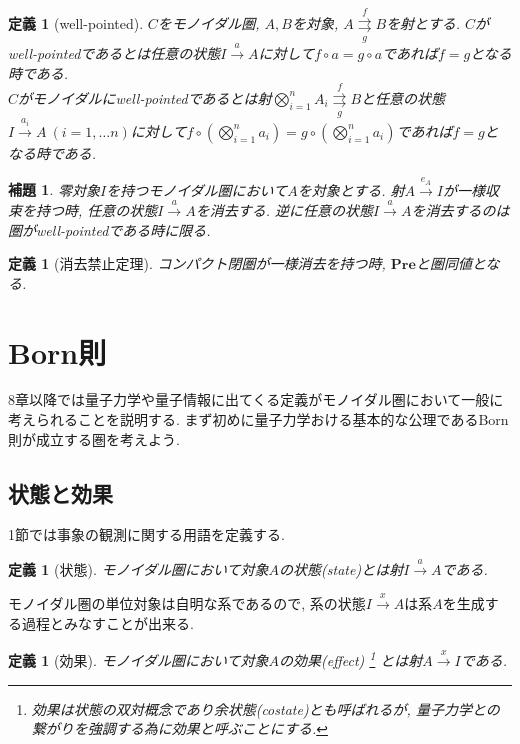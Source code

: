 \documentclass[a4paper,12pt]{ltjsarticle}
\theoremstyle{break}
\newtheorem{defn}[thm]{定義}
\newtheorem{lem}[thm]{補題}
\newcommand{\hilb}{\mathbf{Hilb}}
\newcommand{\pre}{\mathbf{Pre}}
\newcommand{\mbc}{\mathbb{C}}
\newcommand{\xr}[1]{\xrightarrow{#1}}
\newcommand{\ci}{\circ}
\newcommand{\bigot}{\bigotimes}
\numberwithin{equation}{section}
\begin{document}
\begin{defn}[well-pointed]
  $C$をモノイダル圏, $A,B$を対象, $A \overset{f}{\underset{g}{\rightrightarrows}} B$を射とする. 
  $C$がwell-pointedであるとは任意の状態$I \xr{a} A$に対して$f \ci a=g \ci a$であれば$f=g$となる時である. \\
  $C$がモノイダルにwell-pointedであるとは射$\bigot_{i=1}^{n} A_i \overset{f}{\underset{g}{\rightrightarrows}} B$と任意の状態$I \xr{a_i} A ~(i=1,\dots n)$に対して$f \ci \left( \bigot_{i=1}^{n} a_i \right)=g \ci \left( \bigot_{i=1}^{n} a_i \right)$であれば$f=g$となる時である. 
\end{defn}

\begin{lem}
  零対象$I$を持つモノイダル圏において$A$を対象とする. 
  射$A \xr{e_A} I$が一様収束を持つ時, 任意の状態$I \xr{a} A$を消去する. 
  逆に任意の状態$I \xr{a} A$を消去するのは圏がwell-pointedである時に限る. 
\end{lem}

\begin{defn}[消去禁止定理]
  コンパクト閉圏が一様消去を持つ時, $\pre$と圏同値となる. 
\end{defn}

\newpage

\section{Born則}

8章以降では量子力学や量子情報に出てくる定義がモノイダル圏において一般に考えられることを説明する. 
まず初めに量子力学おける基本的な公理であるBorn則が成立する圏を考えよう. 

\subsection{状態と効果}

1節では事象の観測に関する用語を定義する. 

\begin{defn}[状態]
  モノイダル圏において対象$A$の状態(state)とは射$I \xr{a} A$である. 
\end{defn} 

モノイダル圏の単位対象は自明な系であるので, 系の状態$I \xr{x} A$は系$A$を生成する過程とみなすことが出来る. 

\begin{defn}[効果]
  モノイダル圏において対象$A$の効果(effect)
  \footnote{
    効果は状態の双対概念であり余状態(costate)とも呼ばれるが, 量子力学との繋がりを強調する為に効果と呼ぶことにする.
    }
  とは射$A \xr{x} I$である. 
\end{defn}  
\end{document}
